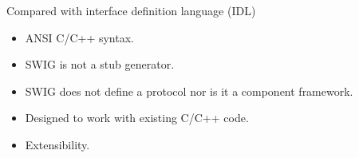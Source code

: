 \begin{frame}{Compared with interface definition language (IDL)}
\begin{itemize}
\item ANSI C/C++ syntax. %
\item SWIG is not a stub generator. %
\item SWIG does not define a protocol nor is it a component framework. %
\item Designed to work with existing C/C++ code. %
\item Extensibility. %
\end{itemize}
\end{frame}



